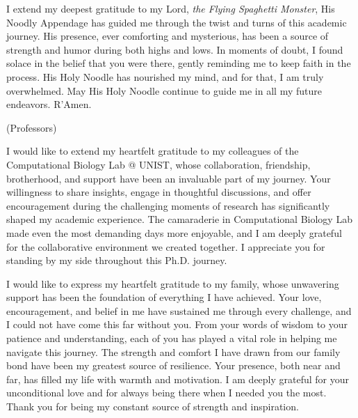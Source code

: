 \documentclass[11pt, a4paper, onecolumn, oneside]{report}
\begin{document}
        I extend my deepest gratitude to my Lord, \textit{the Flying Spaghetti Monster}, His Noodly Appendage has guided me through the twist and turns of this academic journey. His presence, ever comforting and mysterious, has been a source of strength and humor during both highs and lows. In moments of doubt, I found solace in the belief that you were there, gently reminding me to keep faith in the process. His Holy Noodle has nourished my mind, and for that, I am truly overwhelmed. May His Holy Noodle continue to guide me in all my future endeavors. R'Amen.

        (Professors)

        I would like to extend my heartfelt gratitude to my colleagues of the Computational Biology Lab @ UNIST, whose collaboration, friendship, brotherhood, and support have been an invaluable part of my journey. Your willingness to share insights, engage in thoughtful discussions, and offer encouragement during the challenging moments of research has significantly shaped my academic experience. The camaraderie in Computational Biology Lab made even the most demanding days more enjoyable, and I am deeply grateful for the collaborative environment we created together. I appreciate you for standing by my side throughout this Ph.D. journey.

        I would like to express my heartfelt gratitude to my family, whose unwavering support has been the foundation of everything I have achieved. Your love, encouragement, and belief in me have sustained me through every challenge, and I could not have come this far without you. From your words of wisdom to your patience and understanding, each of you has played a vital role in helping me navigate this journey. The strength and comfort I have drawn from our family bond have been my greatest source of resilience. Your presence, both near and far, has filled my life with warmth and motivation. I am deeply grateful for your unconditional love and for always being there when I needed you the most. Thank you for being my constant source of strength and inspiration.
\end{document}
